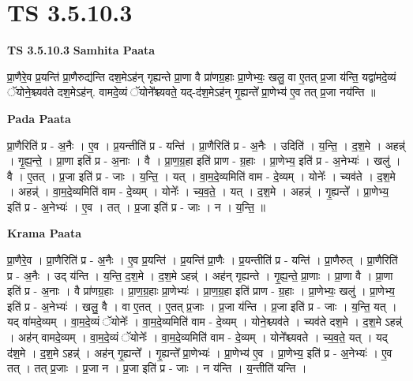 \documentclass[17pt]{extarticle}
\begin{document}
\section{ TS 3.5.10.3 }

\textbf{TS 3.5.10.3 } \newline
\textbf{Samhita Paata} \newline

प्रा॒णैरे॒व प्र॒यन्ति॑ प्रा॒णैरुद्य॑न्ति दश॒मेऽह॑न् गृह्यन्ते प्रा॒णा वै प्रा॑णग्र॒हाः प्रा॒णेभ्यः॒ खलु॒ वा ए॒तत् प्र॒जा य॑न्ति॒ यद्वा॑मदे॒व्यं ॅयोने॒श्च्यव॑ते दश॒मेऽह॑न्. वामदे॒व्यं ॅयोने᳚श्च्यवते॒ यद्-द॑श॒मेऽह॑न् गृ॒ह्यन्ते᳚ प्रा॒णेभ्य॑ ए॒व तत् प्र॒जा नय॑न्ति ॥ \newline

\textbf{Pada Paata} \newline

प्रा॒णैरिति॑ प्र - अ॒नैः । ए॒व । प्र॒यन्तीति॑ प्र - यन्ति॑ । प्रा॒णैरिति॑ प्र - अ॒नैः । उदिति॑ । य॒न्ति॒ । द॒श॒मे । अहन्न्॑ । गृ॒ह्य॒न्ते॒ । प्रा॒णा इति॑ प्र - अ॒नाः । वै । प्रा॒ण॒ग्र॒हा इति॑ प्राण - ग्र॒हाः । प्रा॒णेभ्य॒ इति॑ प्र - अ॒नेभ्यः॑ । खलु॑ । वै । ए॒तत् । प्र॒जा इति॑ प्र - जाः । य॒न्ति॒ । यत् । वा॒म॒दे॒व्यमिति॑ वाम - दे॒व्यम् । योनेः᳚ । च्यव॑ते । द॒श॒मे । अहन्न्॑ । वा॒म॒दे॒व्यमिति॑ वाम - दे॒व्यम् । योनेः᳚ । च्य॒व॒ते॒ । यत् । द॒श॒मे । अहन्न्॑ । गृ॒ह्यन्ते᳚ । प्रा॒णेभ्य॒ इति॑ प्र - अ॒नेभ्यः॑ । ए॒व । तत् । प्र॒जा इति॑ प्र - जाः । न । य॒न्ति॒ ॥  \newline


\textbf{Krama Paata} \newline

प्रा॒णैरे॒व । प्रा॒णैरिति॑ प्र - अ॒नैः । ए॒व प्र॒यन्ति॑ । प्र॒यन्ति॑ प्रा॒णैः । प्र॒यन्तीति॑ प्र - यन्ति॑ । प्रा॒णैरुत् । प्रा॒णैरिति॑ प्र - अ॒नैः । उद् य॑न्ति । य॒न्ति॒ द॒श॒मे । द॒श॒मे ऽहन्न्॑ । अह॑न् गृह्यन्ते । गृ॒ह्य॒न्ते॒ प्रा॒णाः । प्रा॒णा वै । प्रा॒णा इति॑ प्र - अ॒नाः । वै प्रा॑णग्र॒हाः । प्रा॒ण॒ग्र॒हाः प्रा॒णेभ्यः॑ । प्रा॒ण॒ग्र॒हा इति॑ प्राण - ग्र॒हाः । प्रा॒णेभ्यः॒ खलु॑ । प्रा॒णेभ्य॒ इति॑ प्र - अ॒नेभ्यः॑ । खलु॒ वै । वा ए॒तत् । ए॒तत् प्र॒जाः । प्र॒जा य॑न्ति । प्र॒जा इति॑ प्र - जाः । य॒न्ति॒ यत् । यद् वा॑मदे॒व्यम् । वा॒म॒दे॒व्यं ॅयोनेः᳚ । वा॒म॒दे॒व्यमिति॑ वाम - दे॒व्यम् । योने॒श्च्यव॑ते । च्यव॑ते दश॒मे । द॒श॒मे ऽहन्न्॑ । अह॑न् वामदे॒व्यम् । वा॒म॒दे॒व्यं ॅयोनेः᳚ । वा॒म॒दे॒व्यमिति॑ वाम - दे॒व्यम् । योने᳚श्च्यवते । च्य॒व॒ते॒ यत् । यद् द॑श॒मे । द॒श॒मे ऽहन्न्॑ । अह॑न् गृ॒ह्यन्ते᳚ । गृ॒ह्यन्ते᳚ प्रा॒णेभ्यः॑ । प्रा॒णेभ्य॑ ए॒व । प्रा॒णेभ्य॒ इति॑ प्र - अ॒नेभ्यः॑ । ए॒व तत् । तत् प्र॒जाः । प्र॒जा न । प्र॒जा इति॑ प्र - जाः । न य॑न्ति । य॒न्तीति॑ यन्ति । \newline
\end{document}
